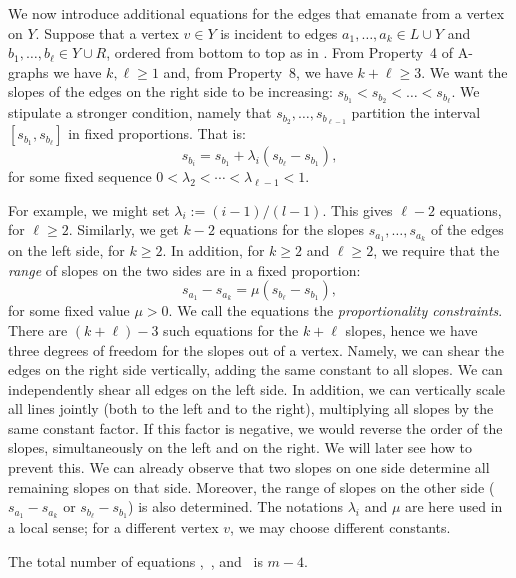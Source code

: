 We now introduce additional equations for the edges that emanate from a
vertex on $Y$.
Suppose that a vertex $v\in Y$ is incident to edges $a_1,\ldots,a_k\in L\cup Y$ 
and $b_1,\ldots,b_\ell\in Y\cup R$, ordered from bottom to top as in .
From Property~4 of A-graphs we have $k,\ell\ge1$ and, from Property~8, we have $k+\ell\ge 3$.
We want the slopes of the edges on the right side to be increasing:
$s_{b_1} < s_{b_2} < \dots  <s_{b_\ell}$. We stipulate a stronger
condition, namely that $s_{b_2}, \dots, s_{b_{\ell-1}}$ partition the interval
$[s_{b_1},s_{b_\ell}]$ in fixed proportions. That is:
\begin{equation}
\label{eq:proportion}
s_{b_i} = s_{b_1} + \lambda_i(s_{b_{\ell}}-s_{b_1}),
\end{equation}
for some fixed sequence $0<\lambda_2<\cdots<\lambda_{\ell-1}<1$.

For example, we might set $\lambda_i := (i-1)/(l-1)$.
This gives $\ell-2$ equations, for $\ell\ge 2$. Similarly, we get
$k-2$ equations for the slopes
$s_{a_1}, \dots, s_{a_{k}}$ of the edges on the left side, for $k\ge 2$.
In addition, for $k\ge 2$ and $\ell\ge 2$, we require that the \emph{range} of
slopes
on the two sides are in a fixed proportion:
\begin{equation}
\label{eq:proportion2}
s_{a_1}-s_{a_{k}} = \mu (s_{b_{\ell}}-s_{b_1}),
\end{equation}
for some fixed value $\mu>0$.
%
We call the equations
\thetag{\ref{eq:proportion}--\ref{eq:proportion2}} the
\emph{proportionality constraints}.
There are $(k+\ell)-3$ such equations for the $k+\ell$ slopes, hence we have three degrees of freedom for the slopes out of a vertex.
Namely, we can shear the edges on the right side vertically, adding the same constant to all
slopes. We can independently shear all edges on the left side.
In addition, we can vertically scale {all} lines jointly (both to
the left and to the right), multiplying all slopes by the same constant factor.
If this factor is negative, we would reverse the order of the
slopes, simultaneously on the left and on the right. We will later see how to prevent this. We can already observe that two slopes on one side determine all remaining slopes on that side. Moreover, the range of slopes on the other side ($s_{a_1}-s_{a_{k}}$ or $s_{b_{\ell}}-s_{b_1}$) is also determined.
%
The notations $\lambda_i$ and $\mu$ are here used in a local sense;
for a different vertex $v$, we may choose different constants.
\begin{lem} \label{le:number-of-equations}
The total number of equations \thetag{\ref{eq:slope0}},~\thetag{\ref{eq:proportion}}, and~\thetag{\ref{eq:proportion2}} is $m-4$.
\end{lem} 

